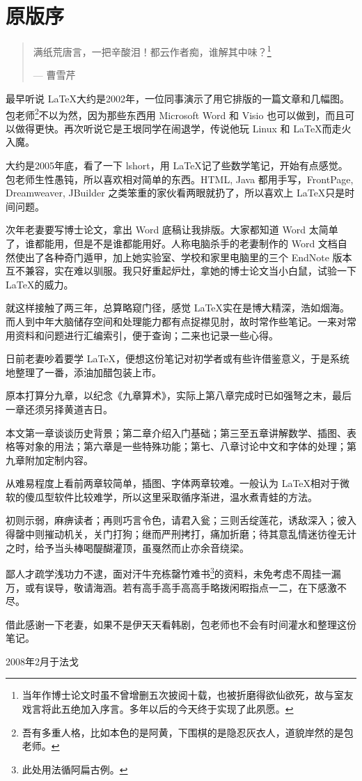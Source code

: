 \chapter{原版序}

\begin{quotation}
满纸荒唐言，一把辛酸泪！都云作者痴，谁解其中味？\footnote{当年作博士论文时虽不曾增删五次披阅十载，也被折磨得欲仙欲死，故与室友戏言将此五绝加入序言。多年以后的今天终于实现了此夙愿。}
\begin{flushright}
    --- 曹雪芹
\end{flushright}
\end{quotation}

最早听说 \LaTeX 大约是2002年，一位同事演示了用它排版的一篇文章和几幅图。包老师\footnote{吾有多重人格，比如本色的是阿黄，下围棋的是隐忍灰衣人，道貌岸然的是包老师。}不以为然，因为那些东西用 Microsoft Word 和 Visio 也可以做到，而且可以做得更快。再次听说它是王垠同学在闹退学，传说他玩 Linux 和 \LaTeX 而走火入魔。

大约是2005年底，看了一下 lshort，用 \LaTeX 记了些数学笔记，开始有点感觉。包老师生性愚钝，所以喜欢相对简单的东西。HTML, Java 都用手写，FrontPage, Dreamweaver, JBuilder 之类笨重的家伙看两眼就扔了，所以喜欢上 \LaTeX 只是时间问题。

次年老妻要写博士论文，拿出 Word 底稿让我排版。大家都知道 Word 太简单了，谁都能用，但是不是谁都能用好。人称电脑杀手的老妻制作的 Word 文档自然使出了各种奇门遁甲，加上她实验室、学校和家里电脑里的三个 EndNote 版本互不兼容，实在难以驯服。我只好重起炉灶，拿她的博士论文当小白鼠，试验一下 \LaTeX 的威力。

就这样接触了两三年，总算略窥门径，感觉 \LaTeX 实在是博大精深，浩如烟海。而人到中年大脑储存空间和处理能力都有点捉襟见肘，故时常作些笔记。一来对常用资料和问题进行汇编索引，便于查询；二来也记录一些心得。

日前老妻吵着要学 \LaTeX，便想这份笔记对初学者或有些许借鉴意义，于是系统地整理了一番，添油加醋包装上市。

原本打算分九章，以纪念《九章算术》，实际上第八章完成时已如强弩之末，最后一章还须另择黄道吉日。

本文第一章谈谈历史背景；第二章介绍入门基础；第三至五章讲解数学、插图、表格等对象的用法；第六章是一些特殊功能；第七、八章讨论中文和字体的处理；第九章附加定制内容。

从难易程度上看前两章较简单，插图、字体两章较难。一般认为 \LaTeX 相对于微软的傻瓜型软件比较难学，所以这里采取循序渐进，温水煮青蛙的方法。

初则示弱，麻痹读者；再则巧言令色，请君入瓮；三则舌绽莲花，诱敌深入；彼入得罄中则摧动机关，关门打狗；继而严刑拷打，痛加折磨；待其意乱情迷彷徨无计之时，给予当头棒喝醍醐灌顶，虽戛然而止亦余音绕梁。

鄙人才疏学浅功力不逮，面对汗牛充栋罄竹难书\footnote{此处用法循阿扁古例。}的资料，未免考虑不周挂一漏万，或有误导，敬请海涵。若有高手高手高高手略拨闲暇指点一二，在下感激不尽。

借此感谢一下老妻，如果不是伊天天看韩剧，包老师也不会有时间灌水和整理这份笔记。

\begin{flushright}
  2008年2月于法戈
\end{flushright}
